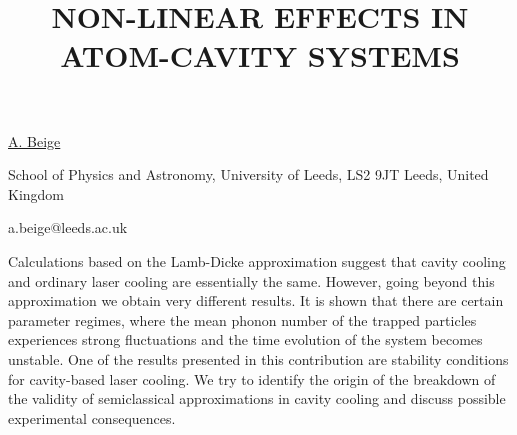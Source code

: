 \title{NON-LINEAR EFFECTS IN ATOM-CAVITY SYSTEMS}

\underline{A. Beige}

{\normalsize{\vspace{-4mm}
School of Physics and Astronomy, University of Leeds, LS2 9JT Leeds, United Kingdom

\email a.beige@leeds.ac.uk}}

Calculations based on the Lamb-Dicke approximation suggest that cavity cooling and ordinary laser cooling are essentially the
same. However, going beyond this approximation we obtain very different results. It is shown that there are certain parameter
regimes, where the mean phonon number of the trapped particles experiences strong fluctuations and the time evolution of the
system becomes unstable. One of the results presented in this contribution are stability conditions for cavity-based laser cooling. We
try to identify the origin of the breakdown of the validity of semiclassical approximations in cavity cooling and discuss possible
experimental consequences.

\vspace{\baselineskip} 
